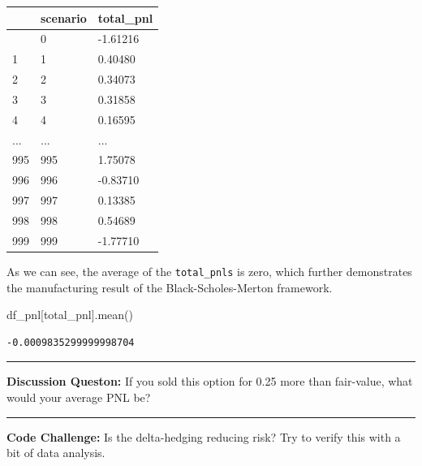 \documentclass[
  letterpaper,
  DIV=11,
  numbers=noendperiod]{scrreprt}
\newenvironment{Shaded}{\begin{snugshade}}{\end{snugshade}}
\newcommand{\CommentTok}[1]{\textcolor[rgb]{0.37,0.37,0.37}{#1}}
\newcommand{\NormalTok}[1]{\textcolor[rgb]{0.00,0.23,0.31}{#1}}
\newcommand{\StringTok}[1]{\textcolor[rgb]{0.13,0.47,0.30}{#1}}
\begin{document}
\begin{longtable}[]{@{}lll@{}}
\toprule\noalign{}
& scenario & total\_pnl \\
\midrule\noalign{}
\endhead
\bottomrule\noalign{}
\endlastfoot
0 & 0 & -1.61216 \\
1 & 1 & 0.40480 \\
2 & 2 & 0.34073 \\
3 & 3 & 0.31858 \\
4 & 4 & 0.16595 \\
... & ... & ... \\
995 & 995 & 1.75078 \\
996 & 996 & -0.83710 \\
997 & 997 & 0.13385 \\
998 & 998 & 0.54689 \\
999 & 999 & -1.77710 \\
\end{longtable}

As we can see, the average of the \texttt{total\_pnls} is zero, which
further demonstrates the manufacturing result of the
Black-Scholes-Merton framework.

\begin{Shaded}
\begin{Highlighting}[]
\NormalTok{df\_pnl[}\StringTok{\textquotesingle{}total\_pnl\textquotesingle{}}\NormalTok{].mean()}
\end{Highlighting}
\end{Shaded}

\begin{verbatim}
-0.0009835299999998704
\end{verbatim}

\begin{center}\rule{0.5\linewidth}{0.5pt}\end{center}

\textbf{Discussion Queston:} If you sold this option for 0.25 more than
fair-value, what would your average PNL be?

\begin{Shaded}
\end{Shaded}

\begin{center}\rule{0.5\linewidth}{0.5pt}\end{center}

\textbf{Code Challenge:} Is the delta-hedging reducing risk? Try to
verify this with a bit of data analysis.
\end{document}

